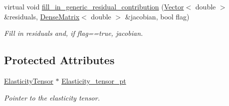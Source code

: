 \begin{DoxyCompactItemize}
virtual void \hyperlink{classoomph_1_1PoroelasticityEquations_a50bcb2f690fb903504c03ea1cc747477}{fill\+\_\+in\+\_\+generic\+\_\+residual\+\_\+contribution} (\hyperlink{classoomph_1_1Vector}{Vector}$<$ double $>$ \&residuals, \hyperlink{classoomph_1_1DenseMatrix}{Dense\+Matrix}$<$ double $>$ \&jacobian, bool flag)
\begin{DoxyCompactList}\small\item\em Fill in residuals and, if flag==true, jacobian. \end{DoxyCompactList}\end{DoxyCompactItemize}
\subsection*{Protected Attributes}
\begin{DoxyCompactItemize}
\item 
\hyperlink{classoomph_1_1ElasticityTensor}{Elasticity\+Tensor} $\ast$ \hyperlink{classoomph_1_1PoroelasticityEquations_a9b4045d28fd71937c3a211d3f14f51d5}{Elasticity\+\_\+tensor\+\_\+pt}
\begin{DoxyCompactList}\small\item\em Pointer to the elasticity tensor. \end{DoxyCompactList}\end{DoxyCompactItemize}
